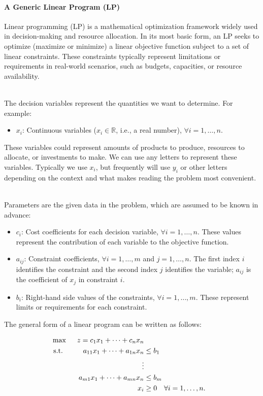 \paragraph{A Generic Linear Program (LP)}

Linear programming (LP) is a mathematical optimization framework widely used in decision-making and resource allocation. In its most basic form, an LP seeks to optimize (maximize or minimize) a linear objective function subject to a set of linear constraints. These constraints typically represent limitations or requirements in real-world scenarios, such as budgets, capacities, or resource availability.

\smallskip {}\\
The decision variables represent the quantities we want to determine. For example:
\begin{itemize}
    \item $x_i$: Continuous variables ($x_i \in \mathbb{R}$, i.e., a real number), $\forall i = 1,\dots,n$.
\end{itemize}
These variables could represent amounts of products to produce, resources to allocate, or investments to make.  We can use any letters to represent these variables.  Typically we use $x_i$, but frequently will use $y_i$ or other letters depending on the context and what makes reading the problem most convenient.

\smallskip {}\\
Parameters are the given data in the problem, which are assumed to be known in advance:
\begin{itemize}
    \item $c_i$: Cost coefficients for each decision variable, $\forall i = 1,\dots,n$. These values represent the contribution of each variable to the objective function.
    \item $a_{ij}$: Constraint coefficients, $\forall i = 1,\dots,m$ and $j = 1,\dots,n$. The first index $i$ identifies the constraint and the second index $j$ identifies the variable; $a_{ij}$ is the coefficient of $x_j$ in constraint $i$.
    \item $b_i$: Right-hand side values of the constraints, $\forall i = 1,\dots,m$. These represent limits or requirements for each constraint.
\end{itemize}

The general form of a linear program can be written as follows:

\begin{equation}
\begin{aligned}
\max\;\;&& z = c_1x_1 + \dots + c_nx_n \\
\mbox{ s.t. }\;\;&& a_{11}x_1 + \dots + a_{1n}x_n &\leq b_1 \\
&& \hspace*{0.5in}\vdots \\
&& a_{m1}x_1 + \dots + a_{mn}x_n &\leq b_m \\
&& x_i &\geq 0 \quad \forall i=1, \dots, n.
\end{aligned}
\label{eqn:GeneralLPMax}
\end{equation}

